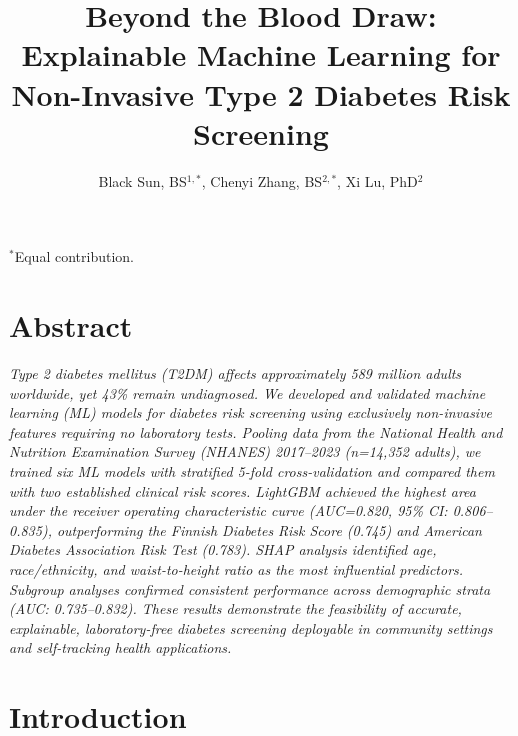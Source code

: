 \documentclass{amia}
\begin{document}
\title{Beyond the Blood Draw: Explainable Machine Learning for Non-Invasive Type 2 Diabetes Risk Screening}

\author{Black Sun, BS$^{1,*}$, Chenyi Zhang, BS$^{2,*}$, Xi Lu, PhD$^{2}$}


\maketitle
\begin{center}
\vspace{-6pt}
{\small $^*$Equal contribution.}
\end{center}
\vspace{-6pt}

\section*{Abstract}

\textit{Type 2 diabetes mellitus (T2DM) affects approximately 589 million adults worldwide, yet 43\% remain undiagnosed. We developed and validated machine learning (ML) models for diabetes risk screening using exclusively non-invasive features requiring no laboratory tests. Pooling data from the National Health and Nutrition Examination Survey (NHANES) 2017--2023 (n=14,352 adults), we trained six ML models with stratified 5-fold cross-validation and compared them with two established clinical risk scores. LightGBM achieved the highest area under the receiver operating characteristic curve (AUC=0.820, 95\% CI: 0.806--0.835), outperforming the Finnish Diabetes Risk Score (0.745) and American Diabetes Association Risk Test (0.783). SHAP analysis identified age, race/ethnicity, and waist-to-height ratio as the most influential predictors. Subgroup analyses confirmed consistent performance across demographic strata (AUC: 0.735--0.832). These results demonstrate the feasibility of accurate, explainable, laboratory-free diabetes screening deployable in community settings and self-tracking health applications.}

\section*{Introduction}
\end{document}
